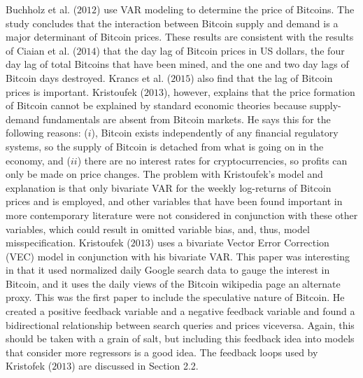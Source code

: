 \documentclass{article}[10 pt]
\newcommand{\vs}{\vspace{0.1in}}
\begin{document}
\vs

Buchholz et al. ($2012$) use VAR modeling to determine the price of
Bitcoins. The study concludes that the interaction between Bitcoin supply
and demand is a major determinant of Bitcoin prices. These results are
consistent with the results of Ciaian et al. ($2014$) that the
day lag of Bitcoin prices in US dollars, the four day lag of total Bitcoins
that have been mined, and the one and two day lags of Bitcoin days
destroyed. Krancs et al. ($2015$) also find that the lag of Bitcoin prices
is important. Kristoufek ($2013$), however, explains that the price formation
of Bitcoin cannot be explained by standard economic theories because
supply-demand fundamentals are absent from Bitcoin markets. He says this for
the following reasons: ($i$), Bitcoin exists independently of any financial
regulatory systems, so the supply of Bitcoin is detached from what is going
on in the economy, and ($ii$) there are no interest rates for
cryptocurrencies, so profits can only be made on price changes. The problem
with Kristoufek's model and explanation
is that only bivariate VAR for the weekly log-returns of Bitcoin prices and
is employed, and other variables
that have been found important in more contemporary literature were not
considered in conjunction with these other variables, which could result in
omitted variable bias, and, thus, model misspecification. Kristoufek
($2013$) uses a bivariate Vector Error Correction (VEC) model in conjunction
with his bivariate VAR. This paper was
interesting in that it used normalized daily Google search data to gauge
the interest in Bitcoin, and it uses the daily views of the Bitcoin
wikipedia page an alternate proxy. This was the first paper to include
the speculative nature of Bitcoin. He created a positive feedback variable
and a negative feedback variable and found a
bidirectional relationship between search queries and prices viceversa.
Again, this should be taken with a grain of salt, but including this
feedback idea into models that consider more regressors is a good idea. The
feedback loops used by Kristofek ($2013$) are discussed in Section 2.2.

\vs
\end{document}
